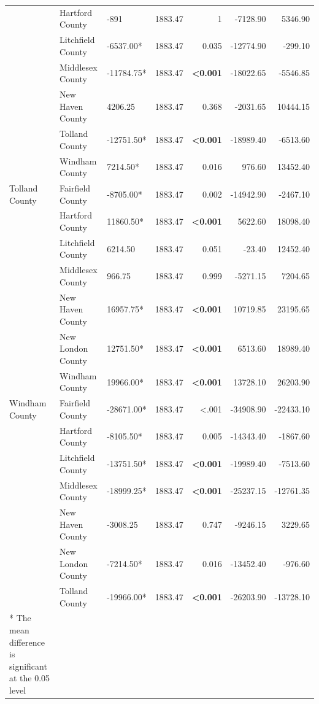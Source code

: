 \documentclass[12pt]{article}
\begin{document}
\begin{table}[htbp]
{\begin{tabular}{lllrrrr}
    & Hartford County & -891 & 1883.47 & 1 & -7128.90 & 5346.90 \\
    & Litchfield County & -6537.00* & 1883.47 & 0.035 & -12774.90 & -299.10 \\
    & Middlesex County & -11784.75* & 1883.47 & \textbf{\textless0.001} & -18022.65 & -5546.85 \\
    & New Haven County & 4206.25 & 1883.47 & 0.368 & -2031.65 & 10444.15 \\
    & Tolland County & -12751.50* & 1883.47 & \textbf{\textless0.001} & -18989.40 & -6513.60 \\
    & Windham County & 7214.50* & 1883.47 & 0.016 & 976.60 & 13452.40 \\
    \midrule
    Tolland County & Fairfield County & -8705.00* & 1883.47 & 0.002 & -14942.90 & -2467.10 \\
    & Hartford County & 11860.50* & 1883.47 & \textbf{\textless0.001} & 5622.60 & 18098.40 \\
    & Litchfield County & 6214.50 & 1883.47 & 0.051 & -23.40 & 12452.40 \\
    & Middlesex County & 966.75 & 1883.47 & 0.999 & -5271.15 & 7204.65 \\
    & New Haven County & 16957.75* & 1883.47 & \textbf{\textless0.001} & 10719.85 & 23195.65 \\
    & New London County & 12751.50* & 1883.47 & \textbf{\textless0.001} & 6513.60 & 18989.40 \\
    & Windham County & 19966.00* & 1883.47 & \textbf{\textless0.001} & 13728.10 & 26203.90 \\
    \midrule
    Windham County & Fairfield County & -28671.00* & 1883.47 & <.001 & -34908.90 & -22433.10 \\
    & Hartford County & -8105.50* & 1883.47 & 0.005 & -14343.40 & -1867.60 \\
    & Litchfield County & -13751.50* & 1883.47 & \textbf{\textless0.001} & -19989.40 & -7513.60 \\
    & Middlesex County & -18999.25* & 1883.47 & \textbf{\textless0.001} & -25237.15 & -12761.35 \\
    & New Haven County & -3008.25 & 1883.47 & 0.747 & -9246.15 & 3229.65 \\
    & New London County & -7214.50* & 1883.47 & 0.016 & -13452.40 & -976.60 \\
    & Tolland County & -19966.00* & 1883.47 & \textbf{\textless0.001} & -26203.90 & -13728.10 \\
    \bottomrule
    * The mean difference is significant at the 0.05 level\\
  \end{tabular}%
  }
\end{table}
    
\end{document}
